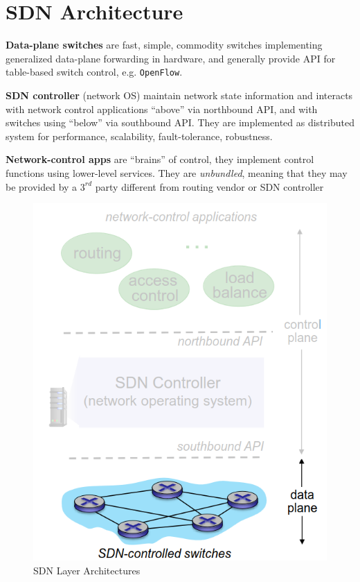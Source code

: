 \section{SDN Architecture}
\begin{paracol}{2}
   \textbf{Data-plane switches} are fast, simple, commodity switches implementing generalized data-plane forwarding in hardware, and generally provide API for table-based switch control, e.g. \texttt{OpenFlow}.

   \textbf{SDN controller} (network OS) maintain network state information and interacts with network control applications ``above'' via northbound API, and with switches using ``below'' via southbound API.
   They are implemented as distributed system for performance, scalability, fault-tolerance, robustness.

   \textbf{Network-control apps} are ``brains'' of control, they implement control functions using lower-level services. They are \textit{unbundled}, meaning that they may be provided by a $3^{rd}$ party different from routing vendor or SDN controller
   \switchcolumn
   \begin{figure}[htbp]
      \centering
      \includegraphics{images/sdn_planes3.png}
      \caption{SDN Layer Architectures}
      \label{fig:sdn_planes3}
   \end{figure}
\end{paracol}

